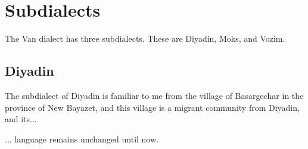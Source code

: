 \begin{table}[H]
	\centering
	\caption{Participles or converbs <> for the verb `to want' in the Van dialect}
	\label{tab:Van:morpho:verb:paradigm:participle}
\end{table}
\section{Subdialects}
The Van dialect has three subdialects. These are Diyadin, Moks, and Vozim. 

\subsection{Diyadin}
The subdialect of Diyadin is familiar to me from the village of Basargechar in the province of New Bayazet, and this village is a migrant community from Diyadin, and its... 



\begin{adjarianpage}\label{page:146}\end{adjarianpage}%

... language remains unchanged until now. 


